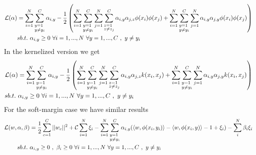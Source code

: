 \begin{align}
	\mathcal{L}(\alpha) &= \sum_{i=1}^N \sum_{\begin{subarray}{l} y=1 \\ y\neq y_i \end{subarray}}^C \alpha_{i,y} -\frac{1}{2}\left( \sum_{i=1}^N \sum_{\begin{subarray}{l} y=1 \\ y\neq y_i \end{subarray}}^C 
		\sum_{j=1}^N \sum_{\begin{subarray}{l} z=1 \\ z\neq z_j \end{subarray}}^C 
	   \alpha_{i,y} \alpha_{j,z} \phi(x_i) \phi(x_j) 
	 +\sum_{i=1}^N \sum_{\begin{subarray}{l} y=1 \\ y\neq y_i \end{subarray}}^C 
	\sum_{j=1}^N 
	   \alpha_{i,y} \alpha_{j,y} \phi(x_i) \phi(x_j) 
	  \right)\\
	&sb.t. ~ \alpha_{i,y} \geq 0 ~ \forall i = 1,...,N ~ \forall y = 1,...,C ~ ,~ y\neq y_i\notag
\end{align}
In the kernelized version we get
\begin{align}
	\mathcal{L}(\alpha) &= \sum_{i=1}^N \sum_{\begin{subarray}{l} y=1 \\ y\neq y_i \end{subarray}}^C \alpha_{i,y} -\frac{1}{2}\left( \sum_{i=1}^N \sum_{\begin{subarray}{l} y=1 \\ y\neq y_i \end{subarray}}^C 
		\sum_{j=1}^N \sum_{\begin{subarray}{l} z=1 \\ z\neq z_j \end{subarray}}^C 
	   \alpha_{i,y} \alpha_{j,z} k(x_i,x_j)
	 +\sum_{i=1}^N \sum_{\begin{subarray}{l} y=1 \\ y\neq y_i \end{subarray}}^C 
	\sum_{j=1}^N 
	   \alpha_{i,y} \alpha_{j,y} k(x_i,x_j) 
	  \right)\\
	sb.t. ~ &\alpha_{i,y} \geq 0 ~ \forall i = 1,...,N ~ \forall y = 1,...,C ~ ,~ y\neq y_i\notag
\end{align}
For the soft-margin case we have similar results
\begin{align} 
	\mathcal{L}(w,\alpha, \beta) &=
	\frac{1}{2} \sum_{c=1}^C ||w_c||^2 + \mathcal{C}\sum_{i=1}^N \xi_i - 
	\sum_{i=1}^N \sum_{\begin{subarray}{l} y=1 \\ y\neq y_i \end{subarray}}^C
	\alpha_{i,y}(\langle w, \phi(x_i,y_i)\rangle - \langle w, \phi(x_i,y)\rangle - 1 +\xi_i )
	- \sum_{i}^N  \beta_i \xi_i \\
	sb.t. ~ &\alpha_{i,y} \geq 0 ~, ~\beta_i \geq 0 ~ \forall i = 1,...,N ~ \forall y = 1,...,C ~ ,~ y\neq y_i\notag
\end{align}
